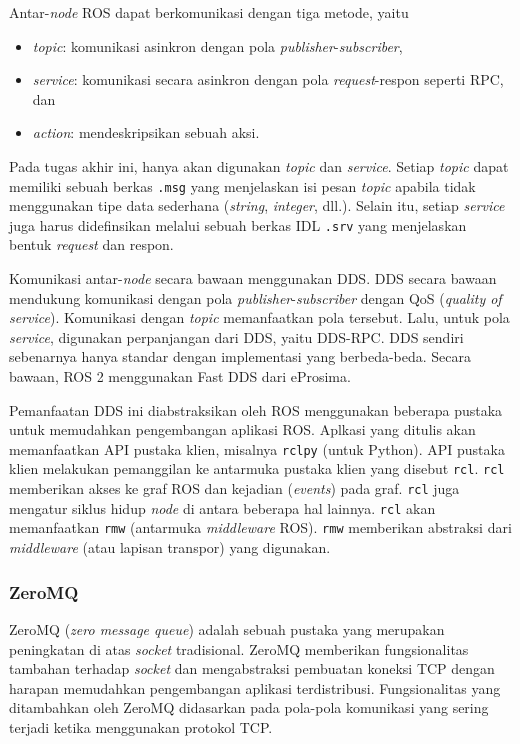 Antar-\textit{node} ROS dapat berkomunikasi dengan tiga metode, yaitu
\begin{itemize}
    \item \textit{topic}: komunikasi asinkron dengan pola
          \textit{publisher}-\textit{subscriber},
    \item \textit{service}: komunikasi secara asinkron dengan pola
          \textit{request}-respon seperti RPC, dan
    \item \textit{action}: mendeskripsikan sebuah aksi.
\end{itemize}
Pada tugas akhir ini, hanya akan digunakan \textit{topic} dan \textit{service}.
Setiap \textit{topic} dapat memiliki sebuah berkas \texttt{.msg} yang
menjelaskan isi pesan \textit{topic} apabila tidak menggunakan tipe data
sederhana (\textit{string}, \textit{integer}, dll.). Selain itu, setiap
\textit{service} juga harus didefinsikan melalui sebuah berkas IDL \texttt{.srv}
yang menjelaskan bentuk \textit{request} dan respon.

Komunikasi antar-\textit{node} secara ba\-wa\-an menggunakan DDS. DDS secara
bawaan mendukung komunikasi dengan pola \textit{publisher}-\textit{subscriber}
dengan QoS (\textit{quality of service}). Komunikasi dengan \textit{topic}
memanfaatkan pola tersebut. Lalu, untuk pola \textit{service}, digunakan
perpanjangan dari DDS, yaitu DDS-RPC. DDS sendiri sebenarnya hanya standar
dengan implementasi yang berbeda-beda. Secara bawaan, ROS 2 menggunakan Fast DDS
dari eProsima.

Pemanfaatan DDS ini diabstraksikan oleh ROS menggunakan beberapa pustaka untuk
memudahkan pengembangan aplikasi ROS. Aplkasi yang ditulis akan memanfaatkan
API pustaka klien, misalnya \texttt{rclpy} (untuk Python). API pustaka klien
melakukan pemanggilan ke antarmuka pustaka klien yang disebut \texttt{rcl}.
\texttt{rcl} memberikan akses ke graf ROS dan kejadian (\textit{events}) pada
graf. \texttt{rcl} juga mengatur siklus hidup \textit{node} di antara beberapa
hal lainnya. \texttt{rcl} akan memanfaatkan \texttt{rmw} (antarmuka
\textit{middleware} ROS). \texttt{rmw} memberikan abstraksi dari
\textit{middleware} (atau lapisan transpor) yang digunakan.

\subsubsection{ZeroMQ}

ZeroMQ (\textit{zero message queue}) adalah sebuah pustaka yang merupakan
pe\-ning\-ka\-tan di atas \textit{socket} tradisional. ZeroMQ memberikan
fungsionalitas tambahan terhadap \textit{socket} dan mengabstraksi pembuatan
koneksi TCP dengan harapan memudahkan pengembangan aplikasi terdistribusi.
Fungsionalitas yang ditambahkan oleh ZeroMQ didasarkan pada pola-pola komunikasi
yang sering terjadi ketika menggunakan protokol TCP.

